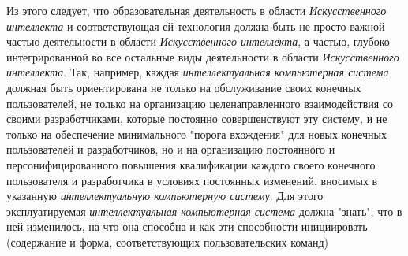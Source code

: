 {{Из этого следует, что образовательная деятельность в области \textit{Искусственного интеллекта} и соответствующая ей технология должна быть не просто важной частью деятельности в области \textit{Искусственного интеллекта}, а частью, глубоко интегрированной во все остальные виды деятельности в области \textit{Искусственного интеллекта}. Так, например, каждая \textit{интеллектуальная компьютерная система} должная быть ориентирована не только на обслуживание своих конечных пользователей, не только на организацию целенаправленного взаимодействия со своими разработчиками, которые постоянно совершенствуют эту систему, и не только на обеспечение минимального "порога вхождения"{} для новых конечных пользователей и разработчиков, но и на организацию постоянного и персонифицированного повышения квалификации каждого своего конечного пользователя и разработчика в условиях постоянных изменений, вносимых в указанную \textit{интеллектуальную компьютерную систему}. Для этого эксплуатируемая \textit{интеллектуальная компьютерная система} должна "знать"{}, что в ней изменилось, на что она способна и как эти способности инициировать (содержание и форма, соответствующих пользовательских команд)
}
}

\scnendstruct

\bigskip
\scnfragmentcaption

